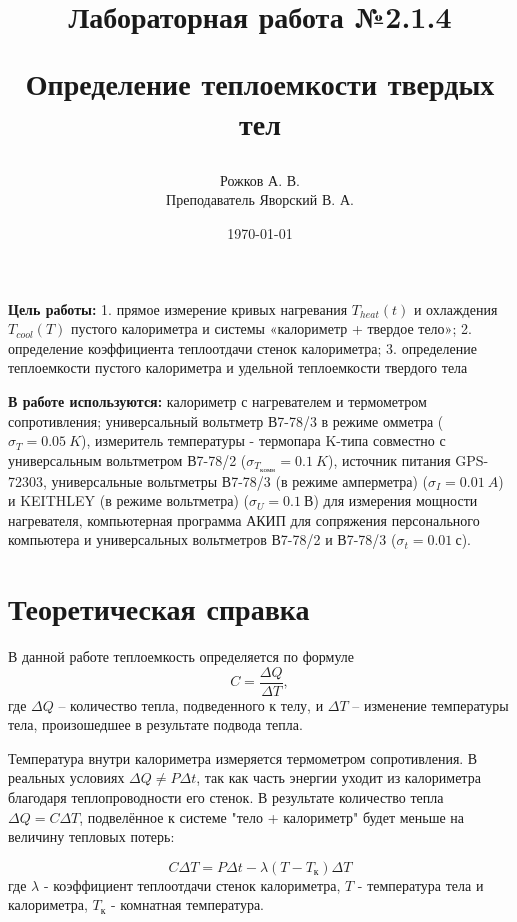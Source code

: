 \documentclass[a4paper, 12pt]{article}
\title{\begin{center}Лабораторная работа №2.1.4\end{center}
Определение теплоемкости твердых тел}
\author{Рожков А. В. \\ Преподаватель Яворский В. А.}
\date{\today}
\begin{document}
    \maketitle
    \newpage

    \textbf{Цель работы:} 1. прямое измерение кривых нагревания $T_{heat}(t)$ и охлаждения $T_{cool}(T)$ пустого калориметра и системы «калориметр + твердое тело»; 2. определение коэффициента теплоотдачи стенок калориметра; 3. определение теплоемкости пустого калориметра и удельной теплоемкости твердого тела

	\textbf{В работе используются:} калориметр с нагревателем и термометром сопротивления; универсальный вольтметр В7-78/3 в режиме омметра ($\sigma_{T} = 0.05~K$), измеритель температуры - термопара K-типа совместно с универсальным вольтметром В7-78/2 ($\sigma_{T_{комн}} = 0.1~K$), источник питания GPS-72303, универсальные вольтметры В7-78/3 (в режиме амперметра) ($\sigma_I = 0.01~A$) и KEITHLEY (в режиме вольтметра) ($\sigma_U = 0.1~В$) для измерения мощности нагревателя, компьютерная программа АКИП для сопряжения персонального компьютера и универсальных вольтметров В7-78/2 и В7-78/3 ($\sigma_t = 0.01~с$).

    \section{Теоретическая справка}

        В данной работе теплоемкость определяется по формуле
        \begin{equation}
            C = \frac{\Delta Q}{\Delta T},
            \label{eq:dQdT}
        \end{equation}
        где $\Delta Q$ -- количество тепла, подведенного к телу, и $\Delta T$ -- изменение температуры тела, произошедшее в результате подвода тепла.

        Температура внутри калориметра измеряется термометром сопротивления. В реальных условиях $\Delta Q \neq P \Delta t$, так как часть энергии уходит из калориметра благодаря теплопроводности его стенок. В результате количество тепла $\Delta Q = C \Delta T$, подвелённое к системе "тело + калориметр" будет меньше на величину тепловых потерь:

        \begin{equation}
            C \Delta T = P \Delta t - \lambda(T - T_к) \Delta T
            \label{eq:C_Delta_T}
        \end{equation}
        где $\lambda$ - коэффициент теплоотдачи стенок калориметра, $T$ - температура тела и калориметра, $T_к$ - комнатная температура.
\end{document}
